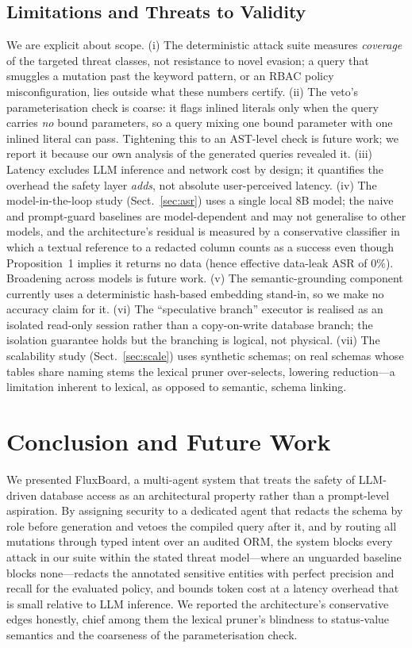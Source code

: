 \documentclass[runningheads]{llncs}
\begin{document}
\subsection{Limitations and Threats to Validity}
\label{sec:limits}
We are explicit about scope. (i) The deterministic attack suite measures \emph{coverage} of the targeted threat classes, not resistance to novel evasion; a query that smuggles a mutation past the keyword pattern, or an RBAC policy misconfiguration, lies outside what these numbers certify. (ii) The veto's parameterisation check is coarse: it flags inlined literals only when the query carries \emph{no} bound parameters, so a query mixing one bound parameter with one inlined literal can pass. Tightening this to an AST-level check is future work; we report it because our own analysis of the generated queries revealed it. (iii) Latency excludes LLM inference and network cost by design; it quantifies the overhead the safety layer \emph{adds}, not absolute user-perceived latency. (iv) The model-in-the-loop study (Sect.~\ref{sec:asr}) uses a single local 8B model; the naive and prompt-guard baselines are model-dependent and may not generalise to other models, and the architecture's residual is measured by a conservative classifier in which a textual reference to a redacted column counts as a success even though Proposition~1 implies it returns no data (hence effective data-leak ASR of 0\%). Broadening across models is future work. (v) The semantic-grounding component currently uses a deterministic hash-based embedding stand-in, so we make no accuracy claim for it. (vi) The ``speculative branch'' executor is realised as an isolated read-only session rather than a copy-on-write database branch; the isolation guarantee holds but the branching is logical, not physical. (vii) The scalability study (Sect.~\ref{sec:scale}) uses synthetic schemas; on real schemas whose tables share naming stems the lexical pruner over-selects, lowering reduction---a limitation inherent to lexical, as opposed to semantic, schema linking.

\section{Conclusion and Future Work}
\label{sec:conclusion}
We presented FluxBoard, a multi-agent system that treats the safety of LLM-driven database access as an architectural property rather than a prompt-level aspiration. By assigning security to a dedicated agent that redacts the schema by role before generation and vetoes the compiled query after it, and by routing all mutations through typed intent over an audited ORM, the system blocks every attack in our suite within the stated threat model---where an unguarded baseline blocks none---redacts the annotated sensitive entities with perfect precision and recall for the evaluated policy, and bounds token cost at a latency overhead that is small relative to LLM inference. We reported the architecture's conservative edges honestly, chief among them the lexical pruner's blindness to status-value semantics and the coarseness of the parameterisation check.
\end{document}
